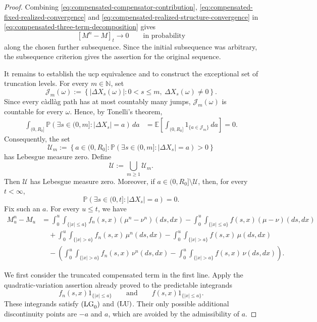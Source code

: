 \documentclass[a4paper,10pt]{article}
\newcommand{\E}{\mathbb E}
\renewcommand{\P}{\mathbb P}
\begin{document}
\begin{proof}
Combining
\eqref{eq:compensated-compensator-contribution},
\eqref{eq:compensated-fixed-realized-convergence} and
\eqref{eq:compensated-realized-structure-convergence} in
\eqref{eq:compensated-three-term-decomposition} gives
\[
        [M^n-M]_t\longrightarrow0
        \qquad\text{in probability}
\]
along the chosen further subsequence. Since the initial subsequence was
arbitrary, the subsequence criterion gives the assertion for the original
sequence.

It remains to establish the ucp equivalence and to construct the
exceptional set of truncation levels. For every \(m\in\mathbb N\), set
\[
\mathcal J_m(\omega)
:=
\left\{
|\Delta X_s(\omega)|:
0<s\le m,\ \Delta X_s(\omega)\ne0
\right\}.
\]
Since every càdlàg path has at most countably many jumps,
\(\mathcal J_m(\omega)\) is countable for every \(\omega\). Hence,
by Tonelli's theorem,
\[
\begin{aligned}
\int_{(0,R_0]}
\P\left(
\exists s\in(0,m]:
|\Delta X_s|=a
\right)\,da
&=
\E\left[
\int_{(0,R_0]}
1_{\{a\in\mathcal J_m\}}\,da
\right]
=
0.
\end{aligned}
\]
Consequently, the set
\[
\mathcal U_m
:=
\left\{
a\in(0,R_0]:
\P\left(
\exists s\in(0,m]:
|\Delta X_s|=a
\right)>0
\right\}
\]
has Lebesgue measure zero. Define
\[
        \mathcal U:=\bigcup_{m\ge1}\mathcal U_m.
\]
Then \(\mathcal U\) has Lebesgue measure zero. Moreover, if
\(a\in(0,R_0]\setminus \mathcal U\), then, for every \(t<\infty\),
\[
\P\left(
\exists s\in(0,t]:
|\Delta X_s|=a
\right)=0.
\]
Fix such an \(a\).
For every \(u\le t\), we have
\begin{align}
M^n_u-M_u
&=
\int_0^u\int_{\{|x|\le a\}}
f_n(s,x)(\mu^n-\nu^n)(ds,dx)
-
\int_0^u\int_{\{|x|\le a\}}
f(s,x)(\mu-\nu)(ds,dx)
\nonumber\\
&\quad+
\int_0^u\int_{\{|x|>a\}}
f_n(s,x)\,\mu^n(ds,dx)
-
\int_0^u\int_{\{|x|>a\}}
f(s,x)\,\mu(ds,dx)
\nonumber\\
&\quad-
\left(
\int_0^u\int_{\{|x|>a\}}
f_n(s,x)\,\nu^n(ds,dx)
-
\int_0^u\int_{\{|x|>a\}}
f(s,x)\,\nu(ds,dx)
\right).
\label{eq:compensated-ucp-decomposition}
\end{align}

We first consider the truncated compensated term in the first line.
Apply the quadratic-variation assertion already proved to the
predictable integrands
\[
        f_n(s,x)1_{\{|x|\le a\}}
        \qquad\text{and}\qquad
        f(s,x)1_{\{|x|\le a\}}.
\]
These integrands satisfy \({\rm (LG}_0{\rm )}\) and \({\rm (LU)}\).
Their only possible additional discontinuity points are
\(-a\) and \(a\), which are avoided by the admissibility of \(a\).


\end{proof}
\end{document}
